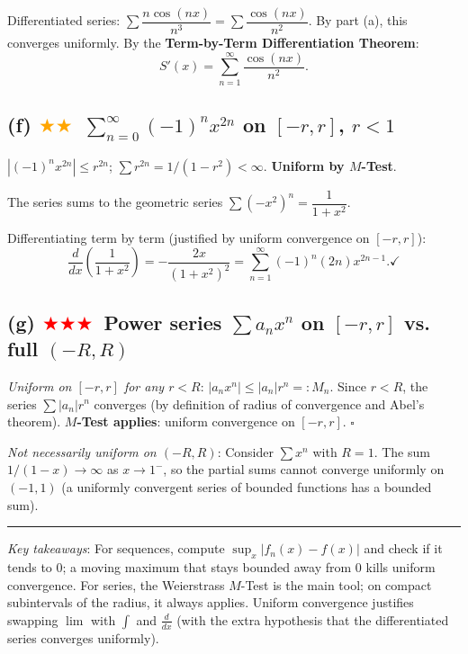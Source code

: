 \documentclass[12pt,a4paper]{article}
\newcommand{\medium}{\textcolor{orange}{$\bigstar\bigstar$}}
\newcommand{\hard}{\textcolor{red}{$\bigstar\bigstar\bigstar$}}
\begin{document}
Differentiated series: $\sum\dfrac{n\cos(nx)}{n^3}=\sum\dfrac{\cos(nx)}{n^2}$.  By part (a), this converges uniformly.  By the \textbf{Term-by-Term Differentiation Theorem}:
\[
  S'(x) = \sum_{n=1}^{\infty}\frac{\cos(nx)}{n^2}.
\]

\subsection*{(f) \medium\ $\displaystyle\sum_{n=0}^{\infty}(-1)^n x^{2n}$ on $[-r,r]$, $r<1$}

$|(-1)^n x^{2n}|\leq r^{2n}$; $\sum r^{2n}=1/(1-r^2)<\infty$.  \textbf{Uniform by $M$-Test}.

The series sums to the geometric series $\sum(-x^2)^n=\dfrac{1}{1+x^2}$.

Differentiating term by term (justified by uniform convergence on $[-r,r]$):
\[
  \frac{d}{dx}\!\left(\frac{1}{1+x^2}\right) = -\frac{2x}{(1+x^2)^2}
  = \sum_{n=1}^{\infty}(-1)^n(2n)x^{2n-1}. \checkmark
\]

\subsection*{(g) \hard\ Power series $\sum a_n x^n$ on $[-r,r]$ vs. full $(-R,R)$}

\textit{Uniform on $[-r,r]$ for any $r<R$}: $|a_n x^n|\leq|a_n|r^n=:M_n$.  Since $r<R$, the series $\sum|a_n|r^n$ converges (by definition of radius of convergence and Abel's theorem).  \textbf{$M$-Test applies}: uniform convergence on $[-r,r]$. $\square$

\textit{Not necessarily uniform on $(-R,R)$}: Consider $\sum x^n$ with $R=1$.  The sum $1/(1-x)\to\infty$ as $x\to 1^-$, so the partial sums cannot converge uniformly on $(-1,1)$ (a uniformly convergent series of bounded functions has a bounded sum).

\bigskip
\hrule
\bigskip
\textit{Key takeaways}: For sequences, compute $\sup_x|f_n(x)-f(x)|$ and check if it tends to $0$; a moving maximum that stays bounded away from $0$ kills uniform convergence. For series, the Weierstrass $M$-Test is the main tool; on compact subintervals of the radius, it always applies.  Uniform convergence justifies swapping $\lim$ with $\int$ and $\frac{d}{dx}$ (with the extra hypothesis that the differentiated series converges uniformly).
\end{document}
